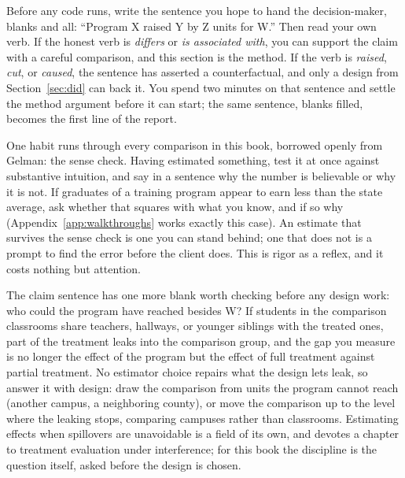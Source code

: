 \documentclass[
    a4paper,
    fontsize=10pt,
    twoside=true,
    numbers=noenddot,
]{kaobook}
\begin{document}
Before any code runs, write the sentence you hope to hand the decision-maker, blanks and all: \enquote{Program X raised Y by Z units for W.} Then read your own verb. If the honest verb is \emph{differs} or \emph{is associated with}, you can support the claim with a careful comparison, and this section is the method. If the verb is \emph{raised}, \emph{cut}, or \emph{caused}, the sentence has asserted a counterfactual, and only a design from Section~\ref{sec:did} can back it. You spend two minutes on that sentence and settle the method argument before it can start; the same sentence, blanks filled, becomes the first line of the report.

One habit runs through every comparison in this book, borrowed openly from Gelman: the sense check. Having estimated something, test it at once against substantive intuition, and say in a sentence why the number is believable or why it is not. If graduates of a training program appear to earn less than the state average, ask whether that squares with what you know, and if so why (Appendix~\ref{app:walkthroughs} works exactly this case). An estimate that survives the sense check is one you can stand behind; one that does not is a prompt to find the error before the client does. This is rigor as a reflex, and it costs nothing but attention.

The claim sentence has one more blank worth checking before any design work: who could the program have reached besides W? If students in the comparison classrooms share teachers, hallways, or younger siblings with the treated ones, part of the treatment leaks into the comparison group, and the gap you measure is no longer the effect of the program but the effect of full treatment against partial treatment. No estimator choice repairs what the design lets leak, so answer it with design: draw the comparison from units the program cannot reach (another campus, a neighboring county), or move the comparison up to the level where the leaking stops, comparing campuses rather than classrooms. Estimating effects when spillovers are unavoidable is a field of its own, and \textcite{huber2023causal} devotes a chapter to treatment evaluation under interference; for this book the discipline is the question itself, asked before the design is chosen.
\end{document}
